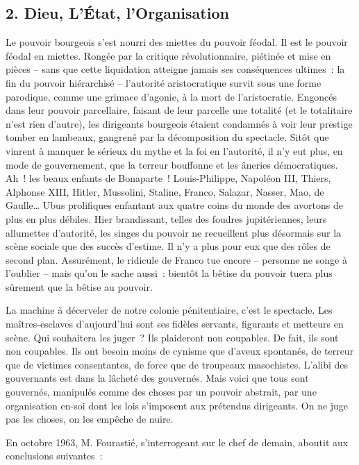 \documentclass[french,twoside]{book} %
\begin{document}
\subsection[{2. Dieu, L’État, l’Organisation}]{\textsc{2.} Dieu, L’État, l’Organisation}
\noindent Le pouvoir bourgeois s’est nourri des miettes du pouvoir féodal. Il est le pouvoir féodal en miettes. Rongée par la critique révolutionnaire, piétinée et mise en pièces – sans que cette liquidation atteigne jamais ses conséquences ultimes : la fin du pouvoir hiérarchisé – l’autorité aristocratique survit sous une forme parodique, comme une grimace d’agonie, à la mort de l’aristocratie. Engoncés dans leur pouvoir parcellaire, faisant de leur parcelle une totalité (et le totalitaire n’est rien d’autre), les dirigeants bourgeois étaient condamnés à voir leur prestige tomber en lambeaux, gangrené par la décomposition du spectacle. Sitôt que vinrent à manquer le sérieux du mythe et la foi en l’autorité, il n’y eut plus, en mode de gouvernement, que la terreur bouffonne et les âneries démocratiques. Ah ! les beaux enfants de Bonaparte ! Louis-Philippe, Napoléon III, Thiers, Alphonse XIII, Hitler, Mussolini, Staline, Franco, Salazar, Nasser, Mao, de Gaulle… Ubus prolifiques enfantant aux quatre coins du monde des avortons de plus en plus débiles. Hier brandissant, telles des foudres jupitériennes, leurs allumettes d’autorité, les singes du pouvoir ne recueillent plus désormais sur la scène sociale que des succès d’estime. Il n’y a plus pour eux que des rôles de second plan. Assurément, le ridicule de Franco tue encore – personne ne songe à l’oublier – mais qu’on le sache aussi : bientôt la bêtise du pouvoir tuera plus sûrement que la bêtise au pouvoir.\par
La machine à décerveler de notre colonie pénitentiaire, c’est le spectacle. Les maîtres-esclaves d’aujourd’hui sont ses fidèles servants, figurants et metteurs en scène. Qui souhaitera les juger ? Ils plaideront non coupables. De fait, ils sont non coupables. Ils ont besoin moins de cynisme que d’aveux spontanés, de terreur que de victimes consentantes, de force que de troupeaux masochistes. L’alibi des gouvernants est dans la lâcheté des gouvernés. Mais voici que tous sont gouvernés, manipulés comme des choses par un pouvoir abstrait, par une organisation en-soi dont les lois s’imposent aux prétendus dirigeants. On ne juge pas les choses, on les empêche de nuire.\par
En octobre 1963, M. Fourastié, s’interrogeant sur le chef de demain, aboutit aux conclusions suivantes :\par
\end{document}
